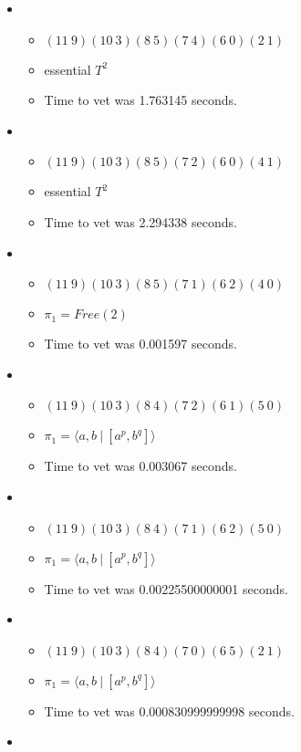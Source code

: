 \documentclass{article}
\begin{document}
\begin{itemize}
\begin{itemize}
\end{itemize}
\item \begin{itemize}
      \item $(11\ 9)(10\ 3)(8\ 5)(7\ 4)(6\ 0)(2\ 1)$
      \item essential $T^2$
      \item Time to vet was 1.763145 seconds.
\end{itemize}
\item \begin{itemize}
      \item $(11\ 9)(10\ 3)(8\ 5)(7\ 2)(6\ 0)(4\ 1)$
      \item essential $T^2$
      \item Time to vet was 2.294338 seconds.
\end{itemize}
\item \begin{itemize}
      \item $(11\ 9)(10\ 3)(8\ 5)(7\ 1)(6\ 2)(4\ 0)$
      \item $\pi_1 =Free(2)$
      \item Time to vet was 0.001597 seconds.
\end{itemize}
\item \begin{itemize}
      \item $(11\ 9)(10\ 3)(8\ 4)(7\ 2)(6\ 1)(5\ 0)$
      \item $\pi_1 = \langle a,b\ |\ [a^p,b^q]\rangle$
      \item Time to vet was 0.003067 seconds.
\end{itemize}
\item \begin{itemize}
      \item $(11\ 9)(10\ 3)(8\ 4)(7\ 1)(6\ 2)(5\ 0)$
      \item $\pi_1 = \langle a,b\ |\ [a^p,b^q]\rangle$
      \item Time to vet was 0.00225500000001 seconds.
\end{itemize}
\item \begin{itemize}
      \item $(11\ 9)(10\ 3)(8\ 4)(7\ 0)(6\ 5)(2\ 1)$
      \item $\pi_1 = \langle a,b\ |\ [a^p,b^q]\rangle$
      \item Time to vet was 0.000830999999998 seconds.
\end{itemize}
\item \begin{itemize}

\end{itemize}
\end{itemize}
\end{document}
